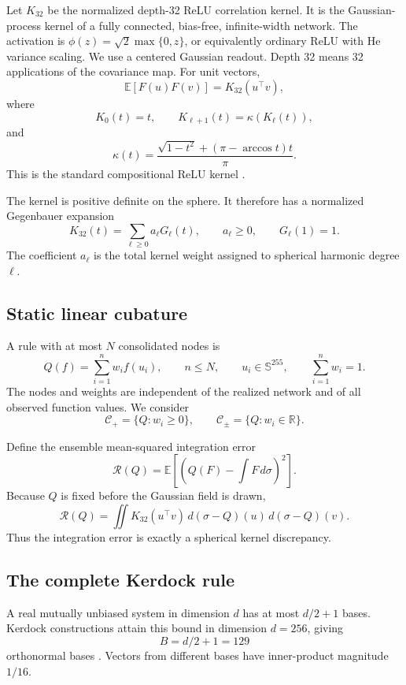 \documentclass[11pt]{article}
\begin{document}
Let \(K_{32}\) be the normalized depth-32 ReLU correlation kernel. It is
the Gaussian-process kernel of a fully connected, bias-free, infinite-width
network. The activation is \(\phi(z)=\sqrt{2}\max\{0,z\}\), or equivalently
ordinary ReLU with He variance scaling. We use a centered Gaussian readout.
Depth 32 means 32 applications of the covariance map. For unit vectors,
\[
\mathbb{E}[F(u)F(v)] = K_{32}(u^\top v),
\]
where
\[
K_0(t)=t, \qquad K_{\ell+1}(t)=\kappa(K_\ell(t)),
\]
and
\[
\kappa(t)=\frac{\sqrt{1-t^2}+(\pi-\arccos t)t}{\pi}.
\]
This is the standard compositional ReLU kernel
\citep{cho2009,daniely2016,lee2018,matthews2018}.

The kernel is positive definite on the sphere. It therefore has a
normalized Gegenbauer expansion
\[
K_{32}(t)=\sum_{\ell\geq 0} a_\ell G_\ell(t),
\qquad a_\ell\geq 0,
\qquad G_\ell(1)=1.
\]
The coefficient \(a_\ell\) is the total kernel weight assigned to
spherical harmonic degree \(\ell\).

\subsection{Static linear cubature}\label{static-linear-cubature}

A rule with at most \(N\) consolidated nodes is
\[
Q(f)=\sum_{i=1}^{n} w_i f(u_i),
\qquad n\leq N,
\qquad u_i\in\mathbb{S}^{255},
\qquad \sum_{i=1}^{n}w_i=1.
\]
The nodes and weights are independent of the realized network and of all
observed function values. We consider
\[
\mathcal{C}_{+}=\{Q:w_i\geq0\},
\qquad
\mathcal{C}_{\pm}=\{Q:w_i\in\mathbb{R}\}.
\]

Define the ensemble mean-squared integration error
\[
\mathcal{R}(Q)
=\mathbb{E}\left[
\left(Q(F)-\int F\,d\sigma\right)^2
\right].
\]
Because \(Q\) is fixed before the Gaussian field is drawn,
\[
\mathcal{R}(Q)
=\iint K_{32}(u^\top v)\,d(\sigma-Q)(u)\,d(\sigma-Q)(v).
\]
Thus the integration error is exactly a spherical kernel discrepancy.

\subsection{The complete Kerdock rule}\label{the-complete-kerdock-rule}

A real mutually unbiased system in dimension \(d\) has at most
\(d/2+1\) bases. Kerdock constructions attain this bound in dimension
\(d=256\), giving
\[
B=d/2+1=129
\]
orthonormal bases \citep{calderbank1997,boykin2005}. Vectors from
different bases have inner-product magnitude \(1/16\).
\end{document}
